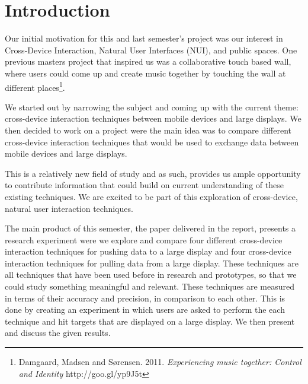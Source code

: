 \section*{Introduction}\label{sec:introduction}
Our initial motivation for this and last semester's project was our interest in Cross-Device Interaction, Natural User Interfaces (NUI), and public spaces.
One previous masters project that inspired us was a collaborative touch based wall, where users could come up and create music together by touching the wall at different places\footnote{Damgaard, Madsen and Sørensen. 2011. \textit{Experiencing music together: Control and Identity} http://goo.gl/yp9J5t}.

We started out by narrowing the subject and coming up with the current theme: cross-device interaction techniques between mobile devices and large displays. 
We then decided to work on a project were the main idea was to compare different cross-device interaction techniques that would be used to exchange data between mobile devices and large displays. 

This is a relatively new field of study and as such, provides us ample opportunity to contribute information that could build on current understanding of these existing techniques. 
We are excited to be part of this exploration of cross-device, natural user interaction techniques. 

The main product of this semester, the paper delivered in the report, presents a research experiment were we explore and compare four different cross-device interaction techniques for pushing data to a large display and four cross-device interaction techniques for pulling data from a large display. 
These techniques are all techniques that have been used before in research and prototypes, so that we could study something meaningful and relevant.
These techniques are measured in terms of their accuracy and precision, in comparison to each other.
This is done by creating an experiment in which users are asked to perform the each technique and hit targets that are displayed on a large display.
We then present and discuss the given results. 